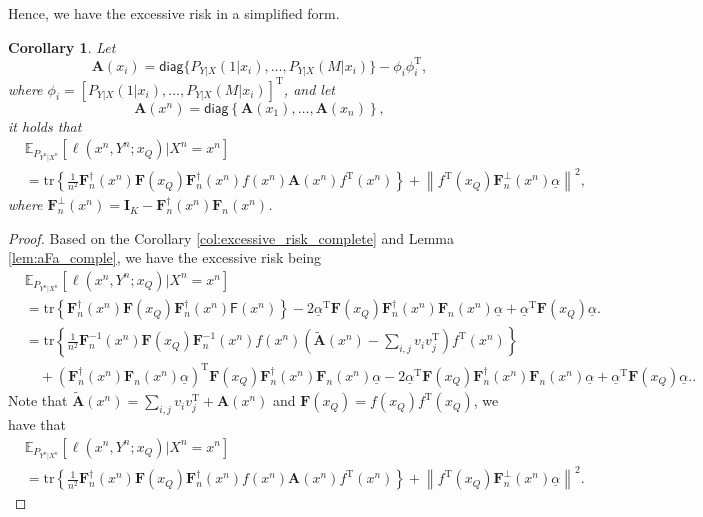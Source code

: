 \documentclass{article} %
\theoremstyle{plain} %
\newtheorem{corollary}[theorem]{Corollary}
\begin{document}
Hence, we have the excessive risk in a simplified form.
\begin{corollary}\label{col:excessive_risk_complete_insufficient_simple}
Let 
\[
\textbf{A}(x_i) = \mathsf{diag}\{P_{Y|X}(1|x_i),\dots,P_{Y|X}(M|x_i)\}-\phi_i\phi_i^\mathrm{T},
\]
where $\phi_i = [P_{Y|X}(1|x_i),\dots,P_{Y|X}(M|x_i)]^\mathrm{T}$, and let
\begin{equation*}
\textbf{A}(x^n) = \mathsf{diag}\left\{ \textbf{A}(x_1), \ldots, \textbf{A}(x_n) \right\},
\end{equation*}
it holds that
\begin{align*}
& \mathbb{E}_{P_{Y^n|X^n}}\left[ 
\ell \left(x^n,Y^n;x_Q\right) | X^n = x^n\right]\\
& = \mathrm{tr}\left\{ \frac1{n^2}\mathbf{F}_n^{\dagger}(x^n)\mathbf{F}(x_Q)\mathbf{F}_n^{\dagger}(x^n) f(x^n) {\mathbf{A}}(x^n) f^\mathrm{T}(x^n) \right\} +
\left\| f ^{\mathrm{T}}(x_Q)\mathbf{F}_n^\perp(x^n)\underline{\alpha}\right\|^2 ,
\end{align*}
where $\mathbf{F}_n^{\perp}(x^n) = \textbf{I}_K-\mathbf{F}_n^\dagger(x^n) \mathbf{F}_n(x^n)$.
\end{corollary}
\begin{proof}
    Based on the Corollary \ref{col:excessive_risk_complete} and Lemma \ref{lem:aFa_comple}, we have the excessive risk being
\begin{align*}
& \mathbb{E}_{P_{Y^n|X^n}}\left[ 
\ell \left(x^n,Y^n;x_Q\right) | X^n = x^n\right]\\
&= \mathrm{tr}\left\{ \mathbf{F}_n^{\dagger}(x^n)\mathbf{F}(x_Q)\mathbf{F}_n^{\dagger}(x^n) \mathsf{F}(x^n) \right\} - 2\underline{\alpha}^\mathrm{T}\mathbf{F}(x_Q)\mathbf{F}_n^{\dagger}(x^n)\mathbf{F}_n(x^n)\underline{\alpha} + \underline{\alpha}^{\mathrm{T}} \mathbf{F}(x_Q)\underline{\alpha}.\\
& = \mathrm{tr}\left\{ \frac1{n^2}\mathbf{F}_n^{-1}(x^n)\mathbf{F}(x_Q)\mathbf{F}_n^{-1}(x^n) f(x^n) \left(\tilde{\mathbf{A}}(x^n) - \sum_{i,j}v_iv_j^\mathrm{T}\right)f^\mathrm{T}(x^n) \right\}\\
& \quad + \left(\mathbf{F}_n^{\dagger}(x^n)\mathbf{F}_n(x^n)\underline{\alpha}\right)^\mathrm{T}\mathbf{F}(x_Q)\mathbf{F}_n^{\dagger}(x^n)\mathbf{F}_n(x^n)\underline{\alpha} - 2\underline{\alpha}^\mathrm{T}\mathbf{F}(x_Q)\mathbf{F}_n^{\dagger}(x^n)\mathbf{F}_n(x^n)\underline{\alpha} + \underline{\alpha}^{\mathrm{T}} \mathbf{F}(x_Q)\underline{\alpha}..
\end{align*}
Note that $\tilde{\mathbf{A}}(x^n) = \sum_{i,j}v_iv_j^\mathrm{T} + \mathbf{A}(x^n)$ and $\mathbf{F}(x_Q) = f(x_Q)f^\mathrm{T}(x_Q)$, we have that
\begin{align*}
& \mathbb{E}_{P_{Y^n|X^n}}\left[ 
\ell \left(x^n,Y^n;x_Q\right) | X^n = x^n\right]\\
& = \mathrm{tr}\left\{ \frac1{n^2}\mathbf{F}_n^{\dagger}(x^n)\mathbf{F}(x_Q)\mathbf{F}_n^{\dagger}(x^n) f(x^n) {\mathbf{A}}(x^n) f^\mathrm{T}(x^n) \right\} +
\left\| f ^{\mathrm{T}}(x_Q)\mathbf{F}_n^\perp(x^n)\underline{\alpha}\right\|^2.
\end{align*}
\end{proof}
\end{document}
